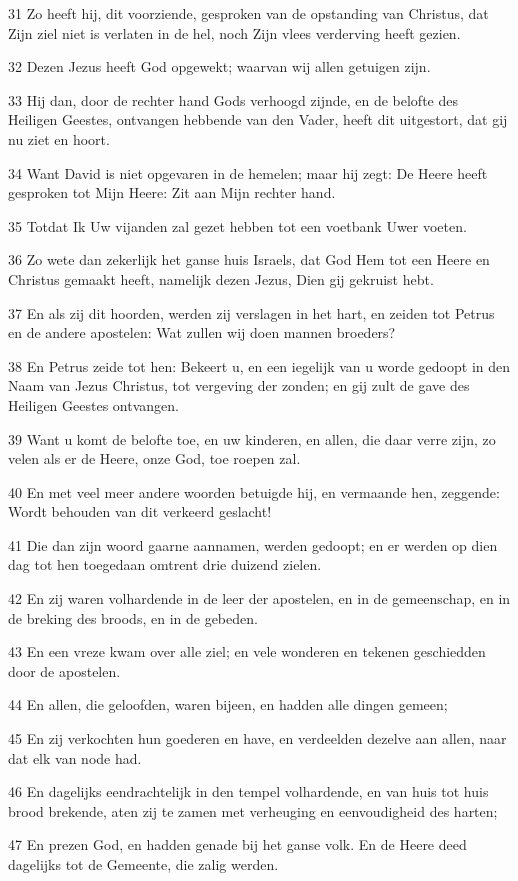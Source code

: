 \par 31 Zo heeft hij, dit voorziende, gesproken van de opstanding van Christus, dat Zijn ziel niet is verlaten in de hel, noch Zijn vlees verderving heeft gezien.
\par 32 Dezen Jezus heeft God opgewekt; waarvan wij allen getuigen zijn.
\par 33 Hij dan, door de rechter hand Gods verhoogd zijnde, en de belofte des Heiligen Geestes, ontvangen hebbende van den Vader, heeft dit uitgestort, dat gij nu ziet en hoort.
\par 34 Want David is niet opgevaren in de hemelen; maar hij zegt: De Heere heeft gesproken tot Mijn Heere: Zit aan Mijn rechter hand.
\par 35 Totdat Ik Uw vijanden zal gezet hebben tot een voetbank Uwer voeten.
\par 36 Zo wete dan zekerlijk het ganse huis Israels, dat God Hem tot een Heere en Christus gemaakt heeft, namelijk dezen Jezus, Dien gij gekruist hebt.
\par 37 En als zij dit hoorden, werden zij verslagen in het hart, en zeiden tot Petrus en de andere apostelen: Wat zullen wij doen mannen broeders?
\par 38 En Petrus zeide tot hen: Bekeert u, en een iegelijk van u worde gedoopt in den Naam van Jezus Christus, tot vergeving der zonden; en gij zult de gave des Heiligen Geestes ontvangen.
\par 39 Want u komt de belofte toe, en uw kinderen, en allen, die daar verre zijn, zo velen als er de Heere, onze God, toe roepen zal.
\par 40 En met veel meer andere woorden betuigde hij, en vermaande hen, zeggende: Wordt behouden van dit verkeerd geslacht!
\par 41 Die dan zijn woord gaarne aannamen, werden gedoopt; en er werden op dien dag tot hen toegedaan omtrent drie duizend zielen.
\par 42 En zij waren volhardende in de leer der apostelen, en in de gemeenschap, en in de breking des broods, en in de gebeden.
\par 43 En een vreze kwam over alle ziel; en vele wonderen en tekenen geschiedden door de apostelen.
\par 44 En allen, die geloofden, waren bijeen, en hadden alle dingen gemeen;
\par 45 En zij verkochten hun goederen en have, en verdeelden dezelve aan allen, naar dat elk van node had.
\par 46 En dagelijks eendrachtelijk in den tempel volhardende, en van huis tot huis brood brekende, aten zij te zamen met verheuging en eenvoudigheid des harten;
\par 47 En prezen God, en hadden genade bij het ganse volk. En de Heere deed dagelijks tot de Gemeente, die zalig werden.

